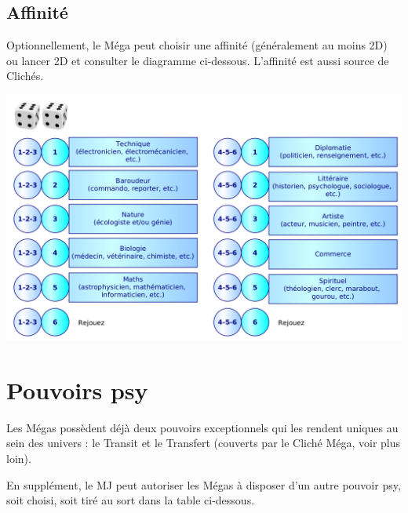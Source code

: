 \documentclass[11pt]{article}
\begin{document}
\subsection{Affinité}

Optionnellement, le Méga peut choisir une affinité (généralement au moins 2D) ou lancer 2D et consulter le diagramme ci-dessous. L'affinité est aussi source de Clichés.

\begin{center}
\includegraphics[scale=0.28]{02-affinite}
\end{center}

\newpage
\section{Pouvoirs psy}

Les Mégas possèdent déjà deux pouvoirs exceptionnels qui les rendent uniques au sein des univers : le Transit et le Transfert (couverts par le Cliché Méga, voir plus loin).

En supplément, le MJ peut autoriser les Mégas à disposer d'un autre pouvoir psy, soit choisi, soit tiré au sort dans la table ci-dessous.
\end{document}
